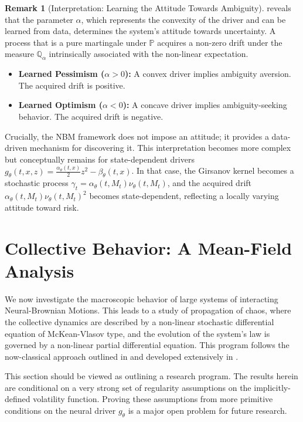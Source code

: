 \documentclass[qian]{imsart}
\newcommand{\Qbb}{\mathbb{Q}}
\newcommand{\Prob}{\mathbb{P}}
\theoremstyle{plain}
\theoremstyle{definition}
\newtheorem{remark}[theorem]{Remark}
\begin{document}
\begin{remark}[Interpretation: Learning the Attitude Towards Ambiguity]
\label{rem:learned_attitude}
 reveals that the parameter $\alpha$, which represents the convexity of the driver and can be learned from data, determines the system's attitude towards uncertainty. A process that is a pure martingale under $\Prob$ acquires a non-zero drift under the measure $\Qbb_\alpha$ intrinsically associated with the non-linear expectation.
\begin{itemize}[leftmargin=*]
    \item \textbf{Learned Pessimism ($\alpha > 0$):} A convex driver implies ambiguity aversion. The acquired drift is positive.
    \item \textbf{Learned Optimism ($\alpha < 0$):} A concave driver implies ambiguity-seeking behavior. The acquired drift is negative.
\end{itemize}
Crucially, the NBM framework does not impose an attitude; it provides a data-driven mechanism for discovering it. This interpretation becomes more complex but conceptually remains for state-dependent drivers $g_\theta(t,x,z) = \frac{\alpha_\theta(t,x)}{2}z^2 - \beta_\theta(t,x)$. In that case, the Girsanov kernel becomes a stochastic process $\gamma_t = \alpha_\theta(t, M_t) \nu_\theta(t, M_t)$, and the acquired drift $\alpha_\theta(t,M_t)\nu_\theta(t,M_t)^2$ becomes state-dependent, reflecting a locally varying attitude toward risk.
\end{remark}

\section{Collective Behavior: A Mean-Field Analysis}
\label{sec:mean_field}

We now investigate the macroscopic behavior of large systems of interacting Neural-Brownian Motions. This leads to a study of propagation of chaos, where the collective dynamics are described by a non-linear stochastic differential equation of McKean-Vlasov type, and the evolution of the system's law is governed by a non-linear partial differential equation. This program follows the now-classical approach outlined in \cite{Sznitman1991} and developed extensively in \cite{CarmonaDelarue2018}.

This section should be viewed as outlining a research program. The results herein are conditional on a very strong set of regularity assumptions on the implicitly-defined volatility function. Proving these assumptions from more primitive conditions on the neural driver $g_\theta$ is a major open problem for future research.
\end{document}

